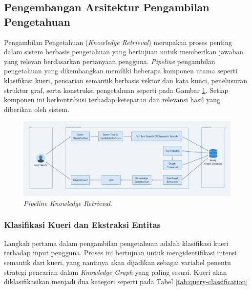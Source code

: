\subsection{Pengembangan Arsitektur Pengambilan Pengetahuan}
Pengambilan Pengetahuan (\textit{Knowledge Retrieval}) merupakan proses penting dalam sistem berbasis pengetahuan yang bertujuan untuk memberikan jawaban yang relevan berdasarkan pertanyaan pengguna.
\textit{Pipeline} pengambilan pengetahuan yang dikembangkan memiliki beberapa komponen utama seperti klasifikasi kueri, pencarian semantik berbasis vektor dan kata kunci, penelusuran struktur graf, serta konstruksi pengetahuan seperti pada Gambar \ref{fig:knowledge-retrieval-pipeline}.
Setiap komponen ini berkontribusi terhadap ketepatan dan relevansi hasil yang diberikan oleh sistem.

\begin{figure}[h]
	\includegraphics[width=1\textwidth]{images/knowledge-retrieval-pipeline.png}
	\caption{\textit{Pipeline Knowledge Retrieval}.}
	\label{fig:knowledge-retrieval-pipeline}
\end{figure}

\subsubsection{Klasifikasi Kueri dan Ekstraksi Entitas}
Langkah pertama dalam pengambilan pengetahuan adalah klasifikasi kueri terhadap input pengguna.
Proses ini bertujuan untuk mengidentifikasi intensi semantik dari kueri, yang nantinya akan dijadikan sebagai variabel penentu strategi pencarian dalam \textit{Knowledge Graph} yang paling sesuai.
Kueri akan diklasifikasikan menjadi dua kategori seperti pada Tabel \ref{tab:query-classification}

